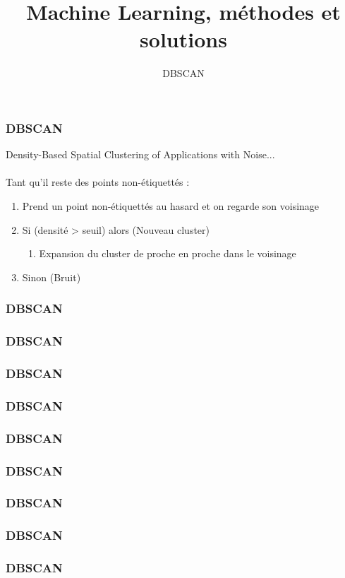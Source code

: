 \documentclass{formation}
\title{Machine Learning, méthodes et solutions}
\subtitle{DBSCAN}
\begin{document}
\maketitle

\begin{frame}
  \frametitle{DBSCAN}
  Density-Based Spatial Clustering of Applications with Noise...\\
  \\
  Tant qu'il reste des points non-étiquettés : \\
  \begin{enumerate}
  \item Prend un point non-étiquettés au hasard et on regarde son voisinage
  \item Si (densité > seuil) alors (Nouveau cluster)
    \begin{enumerate}
    \item Expansion du cluster de proche en proche dans le voisinage
    \end{enumerate}
  \item Sinon (Bruit)
  \end{enumerate}
\end{frame}

\begin{frame}
  \frametitle{DBSCAN}
\end{frame}

\begin{frame}
  \frametitle{DBSCAN}
\end{frame}

\begin{frame}
  \frametitle{DBSCAN}
\end{frame}

\begin{frame}
  \frametitle{DBSCAN}
\end{frame}

\begin{frame}
  \frametitle{DBSCAN}
\end{frame}

\begin{frame}
  \frametitle{DBSCAN}
\end{frame}

\begin{frame}
  \frametitle{DBSCAN}
\end{frame}

\begin{frame}
  \frametitle{DBSCAN}
\end{frame}

\begin{frame}
  \frametitle{DBSCAN}
\end{frame}
\end{document}
